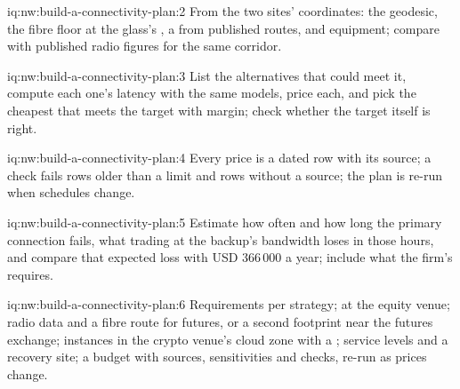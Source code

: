 \begin{solution}{iq:nw:build-a-connectivity-plan:2}
From the two sites' coordinates: the geodesic, the fibre floor at the glass's , a  from published routes, and
equipment; compare with published radio figures for the same corridor.
\end{solution}

\begin{solution}{iq:nw:build-a-connectivity-plan:3}
List the alternatives that could meet it, compute each one's latency with the same models, price each, and pick the cheapest that meets the
target with margin; check whether the target itself is right.
\end{solution}

\begin{solution}{iq:nw:build-a-connectivity-plan:4}
Every price is a dated row with its source; a check fails rows older than a limit and rows without a source; the plan is re-run when
schedules change.
\end{solution}

\begin{solution}{iq:nw:build-a-connectivity-plan:5}
Estimate how often and how long the primary connection fails, what trading at the backup's bandwidth loses in those hours, and compare that
expected loss with USD 366\,000 a year; include what the firm's  requires.
\end{solution}

\begin{solution}{iq:nw:build-a-connectivity-plan:6}
Requirements per strategy;  at the equity venue; radio data and a fibre route for futures, or a second footprint near the futures
exchange; instances in the crypto venue's cloud zone with a ; service levels and a recovery site; a budget with sources,
sensitivities and checks, re-run as prices change.
\end{solution}
